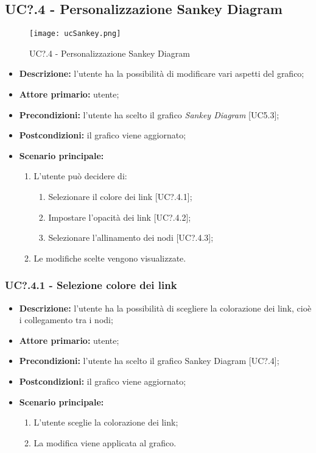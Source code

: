 \subsection{UC?.4 - Personalizzazione Sankey Diagram}
\begin{figure}[H]
  \centering
  \texttt{[image: ucSankey.png]}
  \caption{UC?.4 - Personalizzazione Sankey Diagram}
\end{figure}
\begin{itemize}
    \item \textbf{Descrizione:} l'utente ha la possibilità di modificare vari aspetti del grafico;
    \item \textbf{Attore primario:} utente;
    \item \textbf{Precondizioni:} l’utente ha scelto il grafico \textit{Sankey Diagram} [UC5.3];
    \item \textbf{Postcondizioni:} il grafico viene aggiornato;
    \item \textbf{Scenario principale:}
    \begin{enumerate}
      \item L'utente può decidere di:
    \begin{enumerate}
      \item Selezionare il colore dei link [UC?.4.1];
      \item Impostare l'opacità dei link [UC?.4.2];
      \item Selezionare l'allinamento dei nodi [UC?.4.3];
    \end{enumerate}
    \item Le modifiche scelte vengono visualizzate.
  \end{enumerate}
  \end{itemize}

  \subsubsection{UC?.4.1 - Selezione colore dei link}
  \begin{itemize}
    \item \textbf{Descrizione:} l'utente ha la possibilità di scegliere la colorazione dei link, cioè i collegamento tra i nodi;
    \item \textbf{Attore primario:} utente;
    \item \textbf{Precondizioni:} l’utente ha scelto il grafico Sankey Diagram [UC?.4];
    \item \textbf{Postcondizioni:} il grafico viene aggiornato;
    \item \textbf{Scenario principale:}
     \begin{enumerate}
      \item L'utente sceglie la colorazione dei link;
      \item La modifica viene applicata al grafico.
    \end{enumerate}
  \end{itemize}

